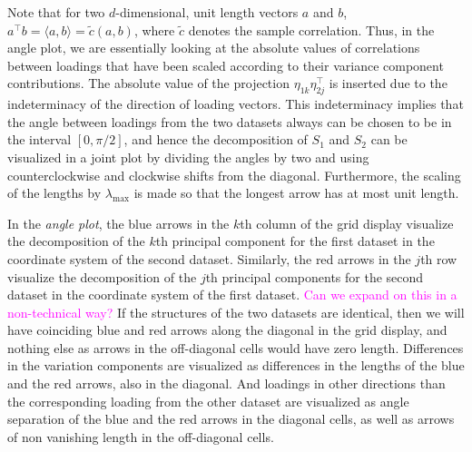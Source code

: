 \documentclass[titlepage,11pt,twoside]{article}
\newcommand{\hl}[1]{\textcolor{magenta}{#1}}
\begin{document}
Note that for two $d$-dimensional, unit length vectors $a$ and $b$, $ a^\top b = \langle a, b \rangle = \tilde{c}(a,b)$, where $\tilde{c}$ denotes the sample correlation. Thus, in the angle plot, we are essentially looking at the absolute values of correlations between loadings that have been scaled according to their variance component contributions. The absolute value of the projection $\eta_{1k} \eta_{2j}^\top$ is inserted due to the indeterminacy of the direction of loading vectors. This indeterminacy implies that the angle between loadings from the two datasets always can be chosen to be in the interval $[0,\pi/2]$, and hence the decomposition of $S_1$ and $S_2$ can be visualized in a joint plot by dividing the angles by two and using counterclockwise and clockwise shifts from the diagonal. Furthermore, the scaling of the lengths by $\lambda_{\max}$ is made so that the longest arrow has at most unit length.

In the \emph{angle plot}, the blue arrows in the $k$th column of the grid display visualize the decomposition of the $k$th principal component for the first dataset in the coordinate system of the second dataset. Similarly, the red arrows in the $j$th row visualize the decomposition of the $j$th principal components for the second dataset in the coordinate system of the first dataset. \hl{Can we expand on this in a non-technical way?} If the structures of the two datasets are identical, then we will have coinciding blue and red arrows along the diagonal in the grid display, and nothing else as arrows in the off-diagonal cells would have zero length. Differences in the variation components are visualized as differences in the lengths of the blue and the red arrows, also in the diagonal. And loadings in other directions than the corresponding loading from the other dataset are visualized as angle separation of the blue and the red arrows in the diagonal cells, as well as arrows of non vanishing length in the off-diagonal cells.
\end{document}
